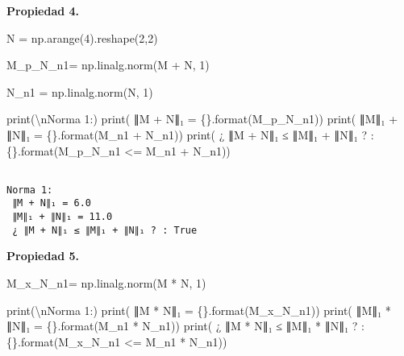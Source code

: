 \documentclass[
  letterpaper,
  DIV=11,
  numbers=noendperiod]{scrreprt}
\newenvironment{Shaded}{\begin{snugshade}}{\end{snugshade}}
\newcommand{\BuiltInTok}[1]{\textcolor[rgb]{0.00,0.23,0.31}{#1}}
\newcommand{\CharTok}[1]{\textcolor[rgb]{0.13,0.47,0.30}{#1}}
\newcommand{\DecValTok}[1]{\textcolor[rgb]{0.68,0.00,0.00}{#1}}
\newcommand{\NormalTok}[1]{\textcolor[rgb]{0.00,0.23,0.31}{#1}}
\newcommand{\OperatorTok}[1]{\textcolor[rgb]{0.37,0.37,0.37}{#1}}
\newcommand{\SpecialCharTok}[1]{\textcolor[rgb]{0.37,0.37,0.37}{#1}}
\newcommand{\StringTok}[1]{\textcolor[rgb]{0.13,0.47,0.30}{#1}}
\begin{document}
\textbf{Propiedad 4.}

\begin{Shaded}
\begin{Highlighting}[]
\NormalTok{N }\OperatorTok{=}\NormalTok{ np.arange(}\DecValTok{4}\NormalTok{).reshape(}\DecValTok{2}\NormalTok{,}\DecValTok{2}\NormalTok{)}

\NormalTok{M\_p\_N\_n1}\OperatorTok{=}\NormalTok{ np.linalg.norm(M }\OperatorTok{+}\NormalTok{ N, }\DecValTok{1}\NormalTok{)}

\NormalTok{N\_n1 }\OperatorTok{=}\NormalTok{ np.linalg.norm(N, }\DecValTok{1}\NormalTok{)}

\BuiltInTok{print}\NormalTok{(}\StringTok{\textquotesingle{}}\CharTok{\textbackslash{}n}\StringTok{Norma 1:\textquotesingle{}}\NormalTok{)}
\BuiltInTok{print}\NormalTok{(}\StringTok{\textquotesingle{} ∥M + N∥₁ = }\SpecialCharTok{\{\}}\StringTok{\textquotesingle{}}\NormalTok{.}\BuiltInTok{format}\NormalTok{(M\_p\_N\_n1))}
\BuiltInTok{print}\NormalTok{(}\StringTok{\textquotesingle{} ∥M∥₁ + ∥N∥₁ = }\SpecialCharTok{\{\}}\StringTok{\textquotesingle{}}\NormalTok{.}\BuiltInTok{format}\NormalTok{(M\_n1 }\OperatorTok{+}\NormalTok{ N\_n1))}
\BuiltInTok{print}\NormalTok{(}\StringTok{\textquotesingle{} ¿ ∥M + N∥₁ ≤ ∥M∥₁ + ∥N∥₁ ? : }\SpecialCharTok{\{\}}\StringTok{\textquotesingle{}}\NormalTok{.}\BuiltInTok{format}\NormalTok{(M\_p\_N\_n1 }\OperatorTok{\textless{}=}\NormalTok{ M\_n1 }\OperatorTok{+}\NormalTok{ N\_n1))}
\end{Highlighting}
\end{Shaded}

\begin{verbatim}

Norma 1:
 ∥M + N∥₁ = 6.0
 ∥M∥₁ + ∥N∥₁ = 11.0
 ¿ ∥M + N∥₁ ≤ ∥M∥₁ + ∥N∥₁ ? : True
\end{verbatim}

\textbf{Propiedad 5.}

\begin{Shaded}
\begin{Highlighting}[]
\NormalTok{M\_x\_N\_n1}\OperatorTok{=}\NormalTok{ np.linalg.norm(M }\OperatorTok{*}\NormalTok{ N, }\DecValTok{1}\NormalTok{)}

\BuiltInTok{print}\NormalTok{(}\StringTok{\textquotesingle{}}\CharTok{\textbackslash{}n}\StringTok{Norma 1:\textquotesingle{}}\NormalTok{)}
\BuiltInTok{print}\NormalTok{(}\StringTok{\textquotesingle{} ∥M * N∥₁ = }\SpecialCharTok{\{\}}\StringTok{\textquotesingle{}}\NormalTok{.}\BuiltInTok{format}\NormalTok{(M\_x\_N\_n1))}
\BuiltInTok{print}\NormalTok{(}\StringTok{\textquotesingle{} ∥M∥₁ * ∥N∥₁ = }\SpecialCharTok{\{\}}\StringTok{\textquotesingle{}}\NormalTok{.}\BuiltInTok{format}\NormalTok{(M\_n1 }\OperatorTok{*}\NormalTok{ N\_n1))}
\BuiltInTok{print}\NormalTok{(}\StringTok{\textquotesingle{} ¿ ∥M * N∥₁ ≤ ∥M∥₁ * ∥N∥₁ ? : }\SpecialCharTok{\{\}}\StringTok{\textquotesingle{}}\NormalTok{.}\BuiltInTok{format}\NormalTok{(M\_x\_N\_n1 }\OperatorTok{\textless{}=}\NormalTok{ M\_n1 }\OperatorTok{*}\NormalTok{ N\_n1))}
\end{Highlighting}
\end{Shaded}
\end{document}
